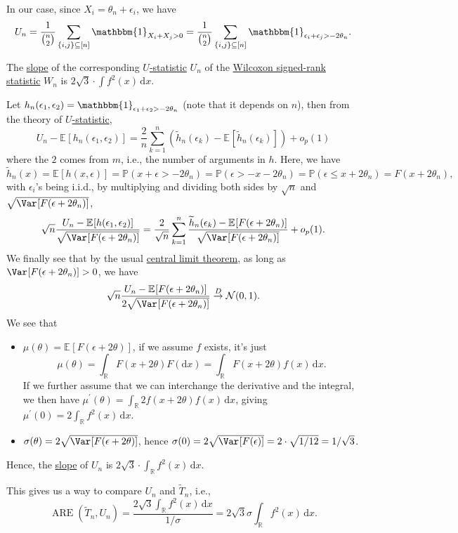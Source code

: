 In our case, since \(X_i = \theta _n + \epsilon _i\), we have
\[
	U_n
	= \frac{1}{\binom{n}{2}} \sum_{\{ i, j \} \subseteq [n]} \mathbbm{1}_{X_i + X_j > 0}
	= \frac{1}{\binom{n}{2}} \sum_{\{ i, j \} \subseteq [n]} \mathbbm{1}_{\epsilon _i + \epsilon _j > - 2 \theta _n}.
\]

\begin{eg}
	The \hyperref[def:slope]{slope} of the corresponding \hyperref[def:U-statistic]{\(U\)-statistic} \(U_n\) of the \hyperref[def:Wilcoxon-signed-rank-statistic]{Wilcoxon signed-rank statistic} \(W_n\) is \(2 \sqrt{3} \cdot \int f^2(x) \,\mathrm{d} x\).
\end{eg}
\begin{explanation}
	Let \(h_n(\epsilon _1, \epsilon _2) = \mathbbm{1}_{\epsilon _1 + \epsilon _2 > - 2 \theta _n} \) (note that it depends on \(n\)), then from the theory of \hyperref[def:U-statistic]{\(U\)-statistic},
	\[
		U_n - \mathbb{E}_{}[h_n(\epsilon _1, \epsilon _2)]
		= \frac{2}{n} \sum_{k=1}^{n} \left( \widetilde{h} _n(\epsilon _k) - \mathbb{E}_{}[\widetilde{h} _n(\epsilon _k)] \right) + o_p(1)
	\]
	where the \(2\) comes from \(m\), i.e., the number of arguments in \(h\). Here, we have
	\[
		\widetilde{h} _n(x)
		= \mathbb{E}_{}[h(x, \epsilon )]
		= \mathbb{P} (x + \epsilon > - 2\theta _n)
		= \mathbb{P} (\epsilon > -x - 2\theta _n)
		= \mathbb{P} (\epsilon \leq x + 2 \theta _n)
		= F(x + 2 \theta _n),
	\]
	with \(\epsilon _i\)'s being i.i.d., by multiplying and dividing both sides by \(\sqrt{n} \) and \(\sqrt{\Var_{}[F(\epsilon + 2 \theta _n)] } \),
	\[
		\sqrt{n} \frac{U_n - \mathbb{E}_{}[h(\epsilon _1 , \epsilon _2)]}{\sqrt{\Var_{}[F(\epsilon + 2 \theta _n)] } }
		= \frac{2}{\sqrt{n} } \sum_{k=1}^{n} \frac{\widetilde{h} _n(\epsilon _k) - \mathbb{E}_{}[F(\epsilon + 2 \theta _n)] }{\sqrt{\Var_{}[F(\epsilon + 2 \theta _n)] } } + o_p(1).
	\]
	We finally see that by the usual \hyperref[thm:CLT]{central limit theorem}, as long as \(\Var_{}[F(\epsilon + 2 \theta _n)] > 0\), we have
	\[
		\sqrt{n} \frac{U_n - \mathbb{E}_{}[F(\epsilon + 2 \theta _n)] }{2 \sqrt{\Var_{}[F(\epsilon + 2 \theta _n)] } }
		\overset{D}{\to} \mathcal{N} (0, 1).
	\]
	We see that
	\begin{itemize}
		\item \(\mu (\theta ) = \mathbb{E}_{}[F(\epsilon + 2 \theta )] \), if we assume \(f\) exists, it's just
		      \[
			      \mu (\theta ) = \int_{\mathbb{R} } F(x + 2 \theta ) F(\mathrm{d} x)
			      = \int_{\mathbb{R} } F(x + 2 \theta ) f(x) \,\mathrm{d} x.
		      \]
		      If we further assume that we can interchange the derivative and the integral, we then have \(\mu ^{\prime} (\theta ) = \int_{\mathbb{R} } 2 f(x + 2\theta ) f(x) \,\mathrm{d} x\), giving \(\mu ^{\prime} (0) = 2 \int_{\mathbb{R}} f^2(x) \,\mathrm{d} x\).
		\item \(\sigma (\theta ) = 2 \sqrt{\Var_{}[F(\epsilon + 2 \theta )] } \), hence \(\sigma (0) = 2 \sqrt{\Var_{}[F(\epsilon )]} = 2 \cdot \sqrt{1 / 12} = 1 / \sqrt{3}  \).
	\end{itemize}
	Hence, the \hyperref[def:slope]{slope} of \(U_n\) is \(2 \sqrt{3} \cdot \int_{\mathbb{R}} f^2(x) \,\mathrm{d} x\).
\end{explanation}

This gives us a way to compare \(U_n\) and \(\widetilde{T} _n\), i.e.,
\[
	\operatorname{ARE}(\widetilde{T} _n, U_n)
	= \frac{2 \sqrt{3} \int_{\mathbb{R} } f^2(x)\,\mathrm{d} x}{1 / \sigma }
	= 2\sqrt{3} \sigma \int_{\mathbb{R} } f^2(x) \,\mathrm{d} x.
\]